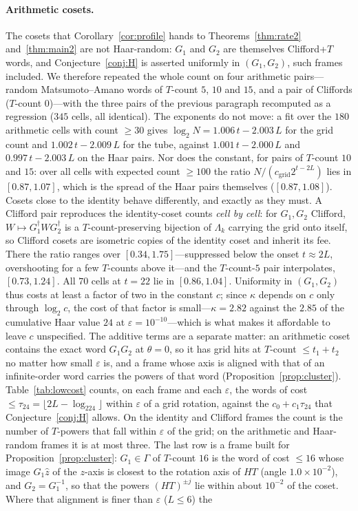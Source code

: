 \documentclass[aps,prx,twocolumn,superscriptaddress,nofootinbib,longbibliography]{revtex4-2}
\theoremstyle{plain}
\theoremstyle{definition}
\theoremstyle{remark}
\begin{document}
\paragraph{Arithmetic cosets.} The cosets that Corollary~\ref{cor:profile} hands to Theorems~\ref{thm:rate2} and~\ref{thm:main2} are not Haar-random: $G_1$ and $G_2$ are themselves Clifford+$T$ words, and Conjecture~\ref{conj:H} is asserted uniformly in $(G_1,G_2)$, such frames included. We therefore repeated the whole count on four arithmetic pairs---random Matsumoto--Amano words of $T$-count $5$, $10$ and $15$, and a pair of Cliffords ($T$-count $0$)---with the three pairs of the previous paragraph recomputed as a regression ($345$ cells, all identical). The exponents do not move: a fit over the $180$ arithmetic cells with count $\ge30$ gives $\log_2N=1.006\,t-2.003\,L$ for the grid count and $1.002\,t-2.009\,L$ for the tube, against $1.001\,t-2.000\,L$ and $0.997\,t-2.003\,L$ on the Haar pairs. Nor does the constant, for pairs of $T$-count $10$ and $15$: over all cells with expected count $\ge100$ the ratio $N/(c_{\mathrm{grid}}2^{t-2L})$ lies in $[0.87,1.07]$, which is the spread of the Haar pairs themselves ($[0.87,1.08]$). Cosets close to the identity behave differently, and exactly as they must. A Clifford pair reproduces the identity-coset counts \emph{cell by cell}: for $G_1,G_2$ Clifford, $W\mapsto G_1^\dagger WG_2^\dagger$ is a $T$-count-preserving bijection of $\Lambda_k$ carrying the grid onto itself, so Clifford cosets are isometric copies of the identity coset and inherit its fee. There the ratio ranges over $[0.34,1.75]$---suppressed below the onset $t\approx2L$, overshooting for a few $T$-counts above it---and the $T$-count-$5$ pair interpolates, $[0.73,1.24]$. All $70$ cells at $t=22$ lie in $[0.86,1.04]$. Uniformity in $(G_1,G_2)$ thus costs at least a factor of two in the constant $c$; since $\kappa$ depends on $c$ only through $\log_2c$, the cost of that factor is small---$\kappa=2.82$ against the $2.85$ of the cumulative Haar value $24$ at $\varepsilon=10^{-10}$---which is what makes it affordable to leave $c$ unspecified. The additive terms are a separate matter: an arithmetic coset contains the exact word $G_1G_2$ at $\theta=0$, so it has grid hits at $T$-count $\le t_1+t_2$ no matter how small $\varepsilon$ is, and a frame whose axis is aligned with that of an infinite-order word carries the powers of that word (Proposition~\ref{prop:cluster}). Table~\ref{tab:lowcost} counts, on each frame and each $\varepsilon$, the words of cost $\le\tau_{24}=\lfloor2L-\log_224\rfloor$ within $\varepsilon$ of a grid rotation, against the $c_0+c_1\tau_{24}$ that Conjecture~\ref{conj:H} allows. On the identity and Clifford frames the count is the number of $T$-powers that fall within $\varepsilon$ of the grid; on the arithmetic and Haar-random frames it is at most three. The last row is a frame built for Proposition~\ref{prop:cluster}: $G_1\in\Gamma$ of $T$-count $16$ is the word of cost $\le16$ whose image $G_1\hat z$ of the $z$-axis is closest to the rotation axis of $HT$ (angle $1.0\times10^{-2}$), and $G_2=G_1^{-1}$, so that the powers $(HT)^{\pm j}$ lie within about $10^{-2}$ of the coset. Where that alignment is finer than $\varepsilon$ ($L\le6$) the 
\end{document}
